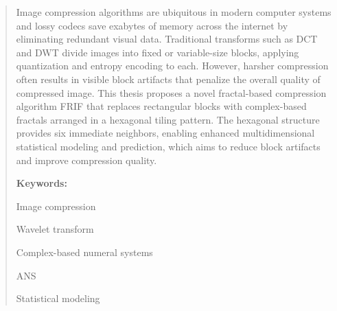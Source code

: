 \begin{abstract}

Image compression algorithms are ubiquitous in modern computer systems and
lossy codecs save exabytes of memory across the internet by eliminating redundant visual data.
Traditional transforms such as DCT and DWT divide images into fixed or variable-size blocks,
applying quantization and entropy encoding to each.
However, harsher compression often results in visible block artifacts that penalize the overall quality of compressed image.
This thesis proposes a novel fractal-based compression algorithm FRIF that replaces rectangular blocks with complex-based fractals
arranged in a hexagonal tiling pattern. The hexagonal structure provides six immediate neighbors, enabling enhanced multidimensional
statistical modeling and prediction, which aims to reduce block artifacts and improve compression quality.

\bigskip
\noindent \textbf{Keywords:}
\begin{itemize*}[label={},itemjoin={{ $\cdot$}}]
    \item Image compression
    \item Wavelet transform
    \item Complex-based numeral systems
    \item ANS
    \item Statistical modeling
\end{itemize*}
\end{abstract}

